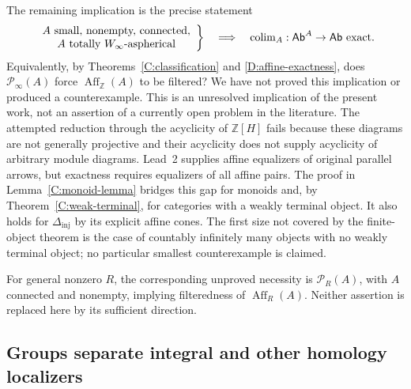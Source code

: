 \begin{remark}\label{D:exact-converse-open}
The remaining implication is the precise statement
\[
 \left.
 \begin{array}{c}
 A\text{ small, nonempty, connected},\\
 A\text{ totally }W_{\infty}\text{-aspherical}
 \end{array}\right\}
 \quad\Longrightarrow\quad
 \operatorname{colim}_A:\mathsf{Ab}^A\to\mathsf{Ab}\text{ exact}.
\]
Equivalently, by Theorems~\ref{C:classification} and \ref{D:affine-exactness}, does $\mathcal P_\infty(A)$ force $\operatorname{Aff}_{\mathbb Z}(A)$ to be filtered? We have not proved this implication or produced a counterexample. This is an unresolved implication of the present work, not an assertion of a currently open problem in the literature. The attempted reduction through the acyclicity of $\mathbb Z[H]$ fails because these diagrams are not generally projective and their acyclicity does not supply acyclicity of arbitrary module diagrams. Lead~2 supplies affine equalizers of original parallel arrows, but exactness requires equalizers of all affine pairs. The proof in Lemma~\ref{C:monoid-lemma} bridges this gap for monoids and, by Theorem~\ref{C:weak-terminal}, for categories with a weakly terminal object. It also holds for $\Delta_{\mathrm{inj}}$ by its explicit affine cones. The first size not covered by the finite-object theorem is the case of countably infinitely many objects with no weakly terminal object; no particular smallest counterexample is claimed.

For general nonzero $R$, the corresponding unproved necessity is $\mathcal P_R(A)$, with $A$ connected and nonempty, implying filteredness of $\operatorname{Aff}_R(A)$. Neither assertion is replaced here by its sufficient direction.
\end{remark}

\subsection{Groups separate integral and other homology localizers}

